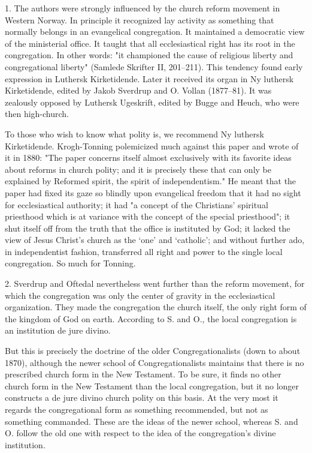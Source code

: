 1. The authors were strongly influenced by the church reform movement in Western Norway. In principle it recognized lay activity as something that normally belongs in an evangelical congregation. It maintained a democratic view of the ministerial office. It taught that all ecclesiastical right has its root in the congregation. In other words: "it championed the cause of religious liberty and congregational liberty" (Samlede Skrifter II, 201–211). This tendency found early expression in Luthersk Kirketidende. Later it received its organ in Ny luthersk Kirketidende, edited by Jakob Sverdrup and O. Vollan (1877–81). It was zealously opposed by Luthersk Ugeskrift, edited by Bugge and Heuch, who were then high-church.

To those who wish to know what polity is, we recommend Ny luthersk Kirketidende. Krogh-Tonning polemicized much against this paper and wrote of it in 1880: "The paper concerns itself almost exclusively with its favorite ideas about reforms in church polity; and it is precisely these that can only be explained by Reformed spirit, the spirit of independentism." He meant that the paper had fixed its gaze so blindly upon evangelical freedom that it had no sight for ecclesiastical authority; it had "a concept of the Christians’ spiritual priesthood which is at variance with the concept of the special priesthood"; it shut itself off from the truth that the office is instituted by God; it lacked the view of Jesus Christ’s church as the ‘one’ and ‘catholic’; and without further ado, in independentist fashion, transferred all right and power to the single local congregation. So much for Tonning.

2. Sverdrup and Oftedal nevertheless went further than the reform movement, for which the congregation was only the center of gravity in the ecclesiastical organization. They made the congregation the church itself, the only right form of the kingdom of God on earth. According to S. and O., the local congregation is an institution de jure divino.

But this is precisely the doctrine of the older Congregationalists (down to about 1870), although the newer school of Congregationalists maintains that there is no prescribed church form in the New Testament. To be sure, it finds no other church form in the New Testament than the local congregation, but it no longer constructs a de jure divino church polity on this basis. At the very most it regards the congregational form as something recommended, but not as something commanded. These are the ideas of the newer school, whereas S. and O. follow the old one with respect to the idea of the congregation’s divine institution.

